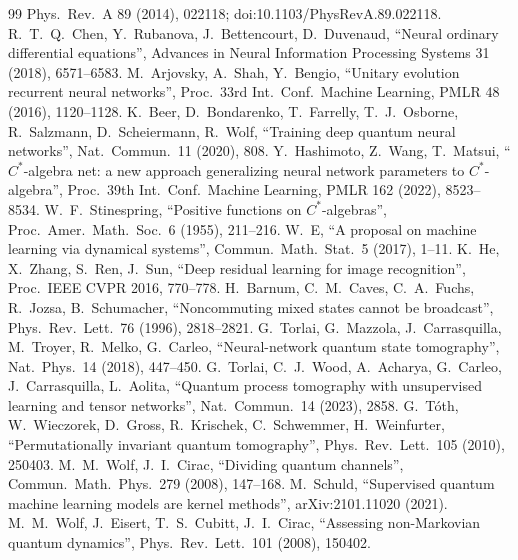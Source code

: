 \documentclass[11pt]{article}
\begin{document}
{\begin{thebibliography}{99}
  Phys.\ Rev.\ A 89 (2014), 022118; doi:10.1103/PhysRevA.89.022118.
 R.~T.~Q.~Chen, Y.~Rubanova, J.~Bettencourt, D.~Duvenaud, ``Neural ordinary differential
  equations'', Advances in Neural Information Processing Systems 31 (2018), 6571--6583.
 M.~Arjovsky, A.~Shah, Y.~Bengio, ``Unitary evolution recurrent neural networks'', Proc.\ 33rd
  Int.\ Conf.\ Machine Learning, PMLR 48 (2016), 1120--1128.
 K.~Beer, D.~Bondarenko, T.~Farrelly, T.~J.~Osborne, R.~Salzmann, D.~Scheiermann, R.~Wolf,
  ``Training deep quantum neural networks'', Nat.\ Commun.\ 11 (2020), 808.
 Y.~Hashimoto, Z.~Wang, T.~Matsui, ``$C^*$-algebra net: a new approach generalizing neural
  network parameters to $C^*$-algebra'', Proc.\ 39th Int.\ Conf.\ Machine Learning, PMLR 162 (2022), 8523--8534.
 W.~F.~Stinespring, ``Positive functions on $C^*$-algebras'', Proc.\ Amer.\ Math.\ Soc.\ 6
  (1955), 211--216.
 W.~E, ``A proposal on machine learning via dynamical systems'', Commun.\ Math.\ Stat.\ 5 (2017), 1--11.
 K.~He, X.~Zhang, S.~Ren, J.~Sun, ``Deep residual learning for image recognition'', Proc.\ IEEE CVPR
  2016, 770--778.
 H.~Barnum, C.~M.~Caves, C.~A.~Fuchs, R.~Jozsa, B.~Schumacher, ``Noncommuting mixed states cannot
  be broadcast'', Phys.\ Rev.\ Lett.\ 76 (1996), 2818--2821.
 G.~Torlai, G.~Mazzola, J.~Carrasquilla, M.~Troyer, R.~Melko, G.~Carleo, ``Neural-network quantum
  state tomography'', Nat.\ Phys.\ 14 (2018), 447--450.
 G.~Torlai, C.~J.~Wood, A.~Acharya, G.~Carleo, J.~Carrasquilla, L.~Aolita, ``Quantum process
  tomography with unsupervised learning and tensor networks'', Nat.\ Commun.\ 14 (2023), 2858.
 G.~T\'oth, W.~Wieczorek, D.~Gross, R.~Krischek, C.~Schwemmer, H.~Weinfurter, ``Permutationally
  invariant quantum tomography'', Phys.\ Rev.\ Lett.\ 105 (2010), 250403.
 M.~M.~Wolf, J.~I.~Cirac, ``Dividing quantum channels'', Commun.\ Math.\ Phys.\ 279 (2008),
  147--168.
 M.~Schuld, ``Supervised quantum machine learning models are kernel methods'',
  arXiv:2101.11020 (2021).
 M.~M.~Wolf, J.~Eisert, T.~S.~Cubitt, J.~I.~Cirac, ``Assessing non-Markovian quantum dynamics'',
  Phys.\ Rev.\ Lett.\ 101 (2008), 150402.
\end{thebibliography}
}
\end{document}
